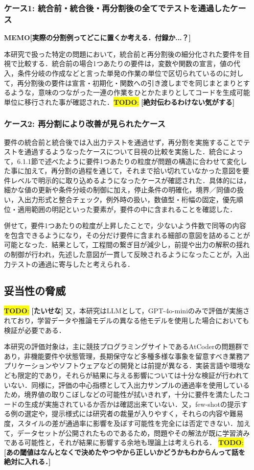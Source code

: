 \documentclass[submit,techrep,noauthor]{ipsj}
\newcommand{\todo}[1]{\colorbox{yellow}{{\bf TODO}:}{\color{red} {\textbf{[#1]}}}}
\newcommand{\memo}[1]{\colorbox{magenta!30}{\textbf{MEMO}}{\color{red!50}\textbf{[#1]}}}
\begin{document}
\subsubsection{ケース1: 統合前・統合後・再分割後の全てでテストを通過したケース}
\memo{実際の分割例ってどこに置くか考える．付録か...？}

本研究で扱った特定の問題において，統合前と再分割後の細分化された要件を目視で比較する．統合前の場合1つあたりの要件は，変数や関数の宣言，値の代入，条件分岐の作成などと言った単発の作業の単位で区切られているのに対して，再分割後の要件は宣言・初期化・関数への引き渡しまでを同じまとまりとするような，意味のつながった一連の作業をひとかたまりとしてコードを生成可能単位に移行された事が確認された．\todo{絶対伝わるわけない気がする}

\subsubsection{ケース2: 再分割により改善が見られたケース}
要件の統合前と統合後では入出力テストを通過せず，再分割を実施することでテストを通過するようなったケースについて目視の比較を実施した．統合によって，6.1.1節で述べたように要件1つあたりの粒度が問題の構造に合わせて変化した事に加えて，再分割の過程を通じて，それまで拾い切れていなかった意図を要件レベルで明示的に取り込めるようになったケースが確認された．具体的には，細かな値の更新や条件分岐の制御に加え，停止条件の明確化，境界／同値の扱い，入出力形式と整合チェック，例外時の扱い，数値型・桁幅の固定，優先順位・適用範囲の明記といった要素が，要件の中に含まれることを確認した．

併せて，要件1つあたりの粒度が上昇したことで，少ないよう件数で同等の内容を包含できるようになり，その分だけ要件に含まれる細部の意図を詰めることが可能となった．結果として，工程間の繋ぎ目が減少し，前提や出力の解釈の揺れの制御が行われ，先述した意図が一貫して反映されるようになったことが，入出力テストの通過に寄与したと考えられる．


\subsection{妥当性の脅威}
\todo{たいせな}
又，本研究はLLMとして，GPT-4o-miniのみで評価が実施されており，学習データや推論モデルの異なる他モデルを使用した場合においても検証が必要である．

本研究の評価対象は，主に競技プログラミングサイトであるAtCoderの問題群であり，非機能要件や状態管理，長期保守など多種多様な事象を留意すべき業務アプリケーションやソフトウェアなどの開発とは前提が異なる．実装言語や環境なども限定的であり，それらが結果に与える影響については十分な検証が行われていない．同様に，評価の中心指標として入出力サンプルの通過率を使用しているため，境界値の取りこぼしなどの可能性が拭いきれず，十分に要件を満たしたコードの生成が実施されているか否かは確認出来ていない．又，few-shotの提示する例の選定や，提示様式には研究者の裁量が入りやすく，それらの内容や難易度，スタイルの差が通過率に影響を及ぼす可能性を完全には否定できない．加えて，データセットが公開されたものであるため，問題やその解法が既に学習済みである可能性と，それが結果に影響する余地も理論上は考えられる．
\todo{あの閾値はなんとなくで決めたやつやから正しいかどうかもわからんって話を絶対に入れる．}
\end{document}
